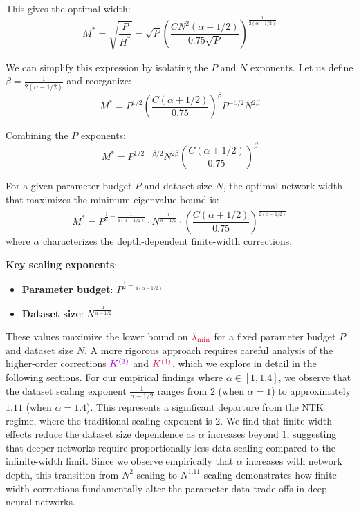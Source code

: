 \documentclass[a4paper]{article}
\theoremstyle{plain}
\theoremstyle{definition}
\theoremstyle{remark}
\begin{document}
This gives the optimal width:
\[
M^* = \sqrt{\frac{P}{H^*}} = \sqrt{P} \left(\frac{CN^2(\alpha + 1/2)}{0.75\sqrt{P}}\right)^{\frac{1}{2(\alpha - 1/2)}}
\]

We can simplify this expression by isolating the $P$ and $N$ exponents. Let us define $\beta = \frac{1}{2(\alpha - 1/2)}$ and reorganize:
\[
M^* = P^{1/2} \left(\frac{C(\alpha + 1/2)}{0.75}\right)^{\beta} P^{-\beta/2} N^{2\beta}
\]

Combining the $P$ exponents:
\[
M^* = P^{1/2 - \beta/2} N^{2\beta} \left(\frac{C(\alpha + 1/2)}{0.75}\right)^{\beta}
\]
\begin{tcolorbox}[colback=blue!10,colframe=blue!60!black,title={\textbf{🎯 OPTIMAL WIDTH FORMULA}},enhanced,drop shadow]
For a given parameter budget $P$ and dataset size $N$, the optimal network width that maximizes the minimum eigenvalue bound is:
\begin{equation}
\boxed{M^* = P^{\frac{1}{2} - \frac{1}{4(\alpha - 1/2)}} \cdot N^{\frac{1}{\alpha - 1/2}} \cdot \left(\frac{C(\alpha + 1/2)}{0.75}\right)^{\frac{1}{2(\alpha - 1/2)}}}
\end{equation}
where $\alpha$ characterizes the depth-dependent finite-width corrections.

\textbf{Key scaling exponents}:
\begin{itemize}
\item \textbf{Parameter budget}: $P^{\frac{1}{2} - \frac{1}{4(\alpha - 1/2)}}$
\item \textbf{Dataset size}: $N^{\frac{1}{\alpha - 1/2}}$
\end{itemize}
\end{tcolorbox}
\begin{tcolorbox}[colback=red!10,colframe=red!60!black,title={\textbf{Optimal Configuration Analysis}},enhanced,drop shadow]
These values maximize the lower bound on $\textcolor{kernelcolor}{\lambda_{\min}}$ for a fixed parameter budget $P$ and dataset size $N$.
A more rigorous approach requires careful analysis of the higher-order corrections 
$\textcolor{k3color}{K^{(3)}}$ and $\textcolor{kernelcolor}{\textcolor{kernelcolor}{K}^{(4)}}$, which we explore in detail in the following sections.
For our empirical findings where $\alpha \in [1, 1.4]$, we observe that the dataset scaling exponent $\frac{1}{\alpha - 1/2}$ ranges from $2$ (when $\alpha = 1$) to approximately $1.11$ (when $\alpha = 1.4$). 
This represents a significant departure from the NTK regime, where the traditional scaling exponent is $2$. We find that finite-width effects reduce the dataset size dependence as $\alpha$ increases beyond $1$, suggesting that deeper networks require proportionally less data scaling compared to the infinite-width limit. Since we observe empirically that $\alpha$ increases with network depth, this transition from $N^2$ scaling to $N^{1.11}$ scaling demonstrates how finite-width corrections fundamentally alter the parameter-data trade-offs in deep neural networks.
\end{tcolorbox}
\end{document}
